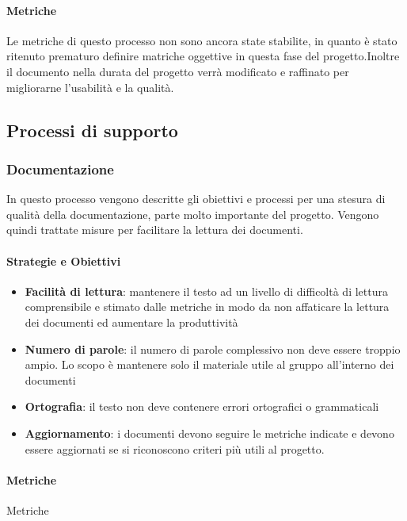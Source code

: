         \paragraph{Metriche}
        Le metriche di questo processo non sono ancora state stabilite, in quanto è stato ritenuto prematuro definire matriche oggettive in questa fase del progetto.Inoltre il documento nella durata del progetto verrà modificato e raffinato per migliorarne l'usabilità e la qualità.
        
        
        
        \subsection{Processi di supporto}
            \subsubsection{Documentazione}
            In questo processo vengono descritte gli obiettivi e processi per una stesura di qualità della documentazione, parte molto importante del progetto. Vengono quindi trattate misure per facilitare la lettura dei documenti.
            
            \paragraph{Strategie e Obiettivi}
            \begin{itemize}
                \item \textbf{Facilità di lettura}: mantenere il testo ad un livello di difficoltà di lettura comprensibile e stimato dalle metriche in modo da non affaticare la lettura dei documenti ed aumentare la produttività
                \item \textbf{Numero di parole}: il numero di parole complessivo non deve essere troppio ampio. Lo scopo è mantenere solo il materiale utile al gruppo all'interno dei documenti
                \item \textbf{Ortografia}: il testo non deve contenere errori ortografici o grammaticali
                \item \textbf{Aggiornamento}: i documenti devono seguire le metriche indicate e devono essere aggiornati se si riconoscono criteri più utili al progetto.
            \end{itemize}
    \newpage
            \paragraph{Metriche}
            Metriche
            
